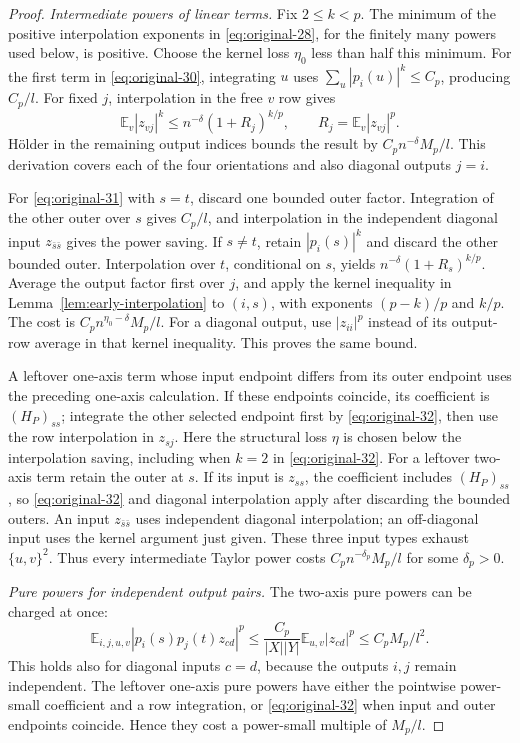 \begin{proof}
\par\smallskip\noindent\textit{Intermediate powers of linear terms.}\quad
Fix \(2\le k<p\). The minimum of the positive interpolation
exponents in \eqref{eq:original-28}, for the finitely many powers
used below, is positive. Choose the kernel loss \(\eta_0\) less
than half this minimum.
For the first term in \eqref{eq:original-30}, integrating \(u\)
uses \(\sum_u|p_i(u)|^k\le C_p\), producing \(C_p/l\).
For fixed \(j\), interpolation in the free \(v\) row gives
\[
 \mathbb E_v|z_{vj}|^k
 \le n^{-\delta}(1+R_j)^{k/p},\qquad
 R_j=\mathbb E_v|z_{vj}|^p.
\]
H\"older in the remaining output indices bounds the result by
\(C_p n^{-\delta}M_p/l\). This derivation covers each of the four
orientations and also diagonal outputs \(j=i\).

For \eqref{eq:original-31} with \(s=t\), discard one bounded
outer factor. Integration of the other outer over \(s\) gives
\(C_p/l\), and interpolation in the independent diagonal input
\(z_{\bar s\bar s}\) gives the power saving. If \(s\ne t\),
retain \(|p_i(s)|^k\) and discard the other bounded outer.
Interpolation over \(t\), conditional on \(s\), yields
\(n^{-\delta}(1+R_s)^{k/p}\). Average the output factor first
over \(j\), and apply the kernel inequality in
Lemma~\ref{lem:early-interpolation} to \((i,s)\), with exponents
\((p-k)/p\) and \(k/p\). The cost is
\(C_p n^{\eta_0-\delta}M_p/l\). For a diagonal output, use
\(|z_{ii}|^p\) instead of its output-row average in that kernel
inequality. This proves the same bound.

A leftover one-axis term whose input endpoint differs from its
outer endpoint uses the preceding one-axis calculation. If these
endpoints coincide, its coefficient is \((H_P)_{ss}\); integrate
the other selected endpoint first by \eqref{eq:original-32}, then
use the row interpolation in \(z_{sj}\). Here the structural loss
\(\eta\) is chosen below the interpolation saving, including when
\(k=2\) in \eqref{eq:original-32}. For a leftover two-axis
term retain the outer at \(s\). If its input is \(z_{ss}\),
the coefficient includes \((H_P)_{ss}\), so
\eqref{eq:original-32} and diagonal interpolation apply after
discarding the bounded outers. An input \(z_{\bar s\bar s}\)
uses independent diagonal interpolation; an off-diagonal input uses
the kernel argument just given. These three input types exhaust
\(\{u,v\}^2\). Thus every intermediate Taylor power costs
\(C_p n^{-\delta_p}M_p/l\) for some \(\delta_p>0\).

\par\smallskip\noindent\textit{Pure powers for independent output pairs.}\quad
The two-axis pure powers can be charged at once:
\[
 \mathbb E_{i,j,u,v}
   |p_i(s)p_j(t)z_{cd}|^p
 \le \frac{C_p}{|X||Y|}\mathbb E_{u,v}|z_{cd}|^p
 \le C_pM_p/l^2.
\]
This holds also for diagonal inputs \(c=d\), because the outputs
\(i,j\) remain independent. The leftover one-axis pure powers
have either the pointwise power-small coefficient and a row
integration, or \eqref{eq:original-32} when input and outer
endpoints coincide. Hence they cost a power-small multiple of
\(M_p/l\).


\end{proof}
